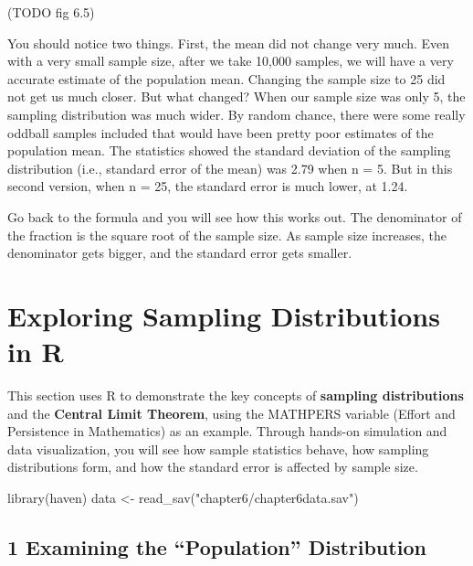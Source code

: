 \documentclass[
  letterpaper,
  DIV=11,
  numbers=noendperiod]{scrreprt}
\newenvironment{Shaded}{\begin{snugshade}}{\end{snugshade}}
\newcommand{\FunctionTok}[1]{\textcolor[rgb]{0.28,0.35,0.67}{#1}}
\newcommand{\NormalTok}[1]{\textcolor[rgb]{0.00,0.23,0.31}{#1}}
\newcommand{\OtherTok}[1]{\textcolor[rgb]{0.00,0.23,0.31}{#1}}
\newcommand{\StringTok}[1]{\textcolor[rgb]{0.13,0.47,0.30}{#1}}
\begin{document}
(TODO fig 6.5)

You should notice two things. First, the mean did not change very much.
Even with a very small sample size, after we take 10,000 samples, we
will have a very accurate estimate of the population mean. Changing the
sample size to 25 did not get us much closer. But what changed? When our
sample size was only 5, the sampling distribution was much wider. By
random chance, there were some really oddball samples included that
would have been pretty poor estimates of the population mean. The
statistics showed the standard deviation of the sampling distribution
(i.e., standard error of the mean) was 2.79 when n = 5. But in this
second version, when n = 25, the standard error is much lower, at 1.24.

Go back to the formula and you will see how this works out. The
denominator of the fraction is the square root of the sample size. As
sample size increases, the denominator gets bigger, and the standard
error gets smaller.


\chapter*{Exploring Sampling Distributions in
R}\label{exploring-sampling-distributions-in-r}


This section uses R to demonstrate the key concepts of \textbf{sampling
distributions} and the \textbf{Central Limit Theorem}, using the
MATHPERS variable (Effort and Persistence in Mathematics) as an example.
Through hands-on simulation and data visualization, you will see how
sample statistics behave, how sampling distributions form, and how the
standard error is affected by sample size.

\begin{Shaded}
\begin{Highlighting}[]
\FunctionTok{library}\NormalTok{(haven) }
\NormalTok{data }\OtherTok{\textless{}{-}} \FunctionTok{read\_sav}\NormalTok{(}\StringTok{"chapter6/chapter6data.sav"}\NormalTok{) }
\end{Highlighting}
\end{Shaded}

\section*{1 Examining the ``Population''
Distribution}\label{examining-the-population-distribution}
\end{document}
